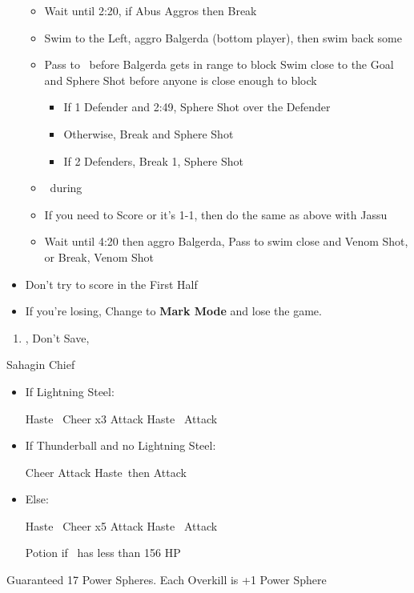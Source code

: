 \begin{blitzball}
\begin{itemize}
\begin{itemize}
			      \item Wait until 2:20, if Abus Aggros then Break
			      \item Swim to the Left, aggro Balgerda (bottom player), then swim back some
			      \item Pass to \tidus\ before Balgerda gets in range to block
			            \tidusf Swim close to the Goal and Sphere Shot before anyone is close enough to block
			            \begin{itemize}
				            \item If 1 Defender and 2:49, Sphere Shot over the Defender
				            \item Otherwise, Break and Sphere Shot
				            \item If 2 Defenders, Break 1, Sphere Shot
			            \end{itemize}
			      \item \sd\ during \wakka\ \cs
			      \item If you need to Score or it's 1-1, then do the same as above with Jassu
			      \item Wait until 4:20 then aggro Balgerda, Pass to \wakka
			            \wakkaf swim close and Venom Shot, or Break, Venom Shot
		      \end{itemize}
		\item Don't try to score in the First Half
		\item If you're losing, Change to \textbf{Mark Mode} and lose the game.
	\end{itemize}
\end{blitzball}
\begin{enumerate}[resume]
	\item \sd, Don't Save, \cs[1:00]
\end{enumerate}
\bothvfill\winvfill\lossvfill
\begin{battle}{Sahagin Chief}
	\begin{itemize}
		\item{If Lightning Steel:}
		      \begin{itemize}
			      \tidusf Haste \tidus\
			      \tidusf Cheer x3
			      \wakkaf Attack
			      \tidusf Haste \wakka\
			      \tidusf Attack
		      \end{itemize}
		\item{If Thunderball and no Lightning Steel:}
		      \begin{itemize}
			      \tidusf Cheer
			      \wakkaf Attack
			      \tidusf Haste \tidus\,then \wakka
			      \tidusf Attack
		      \end{itemize}
		\item{Else:}
		      \begin{itemize}
			      \tidusf Haste \tidus\
			      \tidusf Cheer x5
			      \wakkaf Attack
			      \tidusf Haste \wakka\
			      \tidusf Attack
		      \end{itemize}	      
	\wakkaf Potion if \tidus\ has less than 156 HP
	\end{itemize}
	Guaranteed 17 Power Spheres. Each Overkill is +1 Power Sphere
\end{battle}
